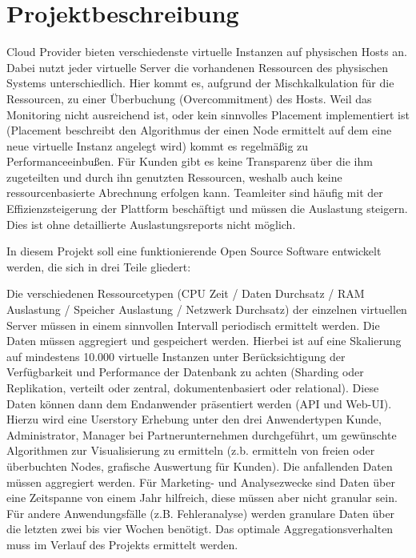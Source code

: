 \section{Projektbeschreibung}

Cloud Provider bieten verschiedenste virtuelle Instanzen auf physischen Hosts
an. Dabei nutzt jeder virtuelle Server die vorhandenen Ressourcen des
physischen Systems unterschiedlich. Hier kommt es, aufgrund der
Mischkalkulation für die Ressourcen, zu einer Überbuchung (Overcommitment) des
Hosts. Weil das Monitoring nicht ausreichend ist, oder kein sinnvolles
Placement implementiert ist (Placement beschreibt den Algorithmus der einen
Node ermittelt auf dem eine neue virtuelle Instanz angelegt wird) kommt es
regelmäßig zu Performanceeinbußen. Für Kunden gibt es keine Transparenz über
die ihm zugeteilten und durch ihn genutzten Ressourcen, weshalb auch keine
ressourcenbasierte Abrechnung erfolgen kann. Teamleiter sind häufig mit der
Effizienzsteigerung der Plattform beschäftigt und müssen die Auslastung
steigern. Dies ist ohne detaillierte Auslastungsreports nicht möglich.

In diesem Projekt soll eine funktionierende Open Source Software entwickelt
werden, die sich in drei Teile gliedert:
\begin{outline}
  \1 Die verschiedenen Ressourcetypen (CPU Zeit / Daten Durchsatz / RAM
  Auslastung / Speicher Auslastung / Netzwerk Durchsatz) der einzelnen
  virtuellen Server müssen in einem sinnvollen Intervall periodisch ermittelt
  werden.
  \1 Die Daten müssen aggregiert und gespeichert werden. Hierbei ist auf eine
  Skalierung auf mindestens 10.000 virtuelle Instanzen unter Berücksichtigung
  der Verfügbarkeit und Performance der Datenbank zu achten (Sharding oder
  Replikation, verteilt oder zentral, dokumentenbasiert oder relational).
  \1 Diese Daten können dann dem Endanwender präsentiert werden (API und
  Web-UI). Hierzu wird eine Userstory Erhebung unter den drei Anwendertypen
  Kunde, Administrator, Manager bei Partnerunternehmen durchgeführt, um
  gewünschte Algorithmen zur Visualisierung zu ermitteln (z.b. ermitteln von
  freien oder überbuchten Nodes, grafische Auswertung für Kunden).
  \1 Die anfallenden Daten müssen aggregiert werden. Für Marketing- und
  Analysezwecke sind Daten über eine Zeitspanne von einem Jahr hilfreich, diese
  müssen aber nicht granular sein. Für andere Anwendungsfälle (z.B.
  Fehleranalyse) werden granulare Daten über die letzten zwei bis vier Wochen
  benötigt. Das optimale Aggregationsverhalten muss im Verlauf des Projekts
  ermittelt werden.
\end{outline}

